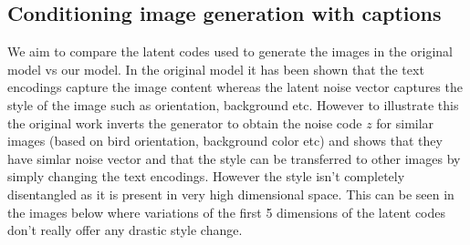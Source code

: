\documentclass{article}
\let\cite=\supercite
\begin{document}
\subsection{Conditioning image generation with captions}
We aim to compare the latent codes used to generate the images in the original
model vs our model. In the original model it has been shown that the text
encodings capture the image content whereas the latent noise vector captures the
style of the image such as orientation, background etc. However to illustrate
this the original work \cite{text2image} inverts the generator to obtain the
noise code $z$ for similar images (based on bird orientation, background color
etc) and shows that they have simlar noise vector and that the style can be
transferred to other images by simply changing the text encodings. However the
style isn't completely disentangled as it is present in very high dimensional
space. This can be seen in the images below where variations of the first 5
dimensions of the latent codes don't really offer any drastic style change.
\end{document}
